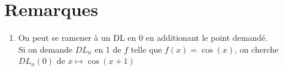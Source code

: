 \documentclass[fleqn]{article}
\theoremstyle{definition} \newtheorem*{defi}{D\'efinition}
\theoremstyle{definition} \newtheorem*{theo}{Th\'eor\`eme}
\theoremstyle{definition} \newtheorem*{prop}{Propri\'et\'e}
\theoremstyle{definition} \newtheorem*{coro}{Corollaire}
\theoremstyle{remark} \newtheorem*{rqs}{Remarques}
\begin{document}
\section{Remarques}
\begin{enumerate}
	\item On peut se ramener \`a un DL en $0$ en additionant le point demand\'e. \\
	Si on demande $DL_n$ en 1 de $f$ telle que $f(x) = \cos(x)$, on cherche $DL_n(0)$ de $x \mapsto \cos(x+1)$
\end{enumerate}
\end{document}
